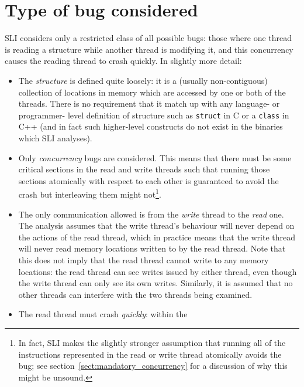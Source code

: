 \section{Type of bug considered}

SLI considers only a restricted class of all possible bugs: those
where one thread is reading a structure while another thread is
modifying it, and this concurrency causes the reading thread to crash
quickly.  In slightly more detail:

\begin{itemize}
\item The \emph{structure} is defined quite loosely: it is a (usually
  non-contiguous) collection of locations in memory which are accessed
  by one or both of the threads.  There is no requirement that it
  match up with any language- or programmer- level definition of
  structure such as \verb|struct| in C or a \verb|class| in C++ (and
  in fact such higher-level constructs do not exist in the binaries
  which SLI analyses).
\item Only \emph{concurrency} bugs are considered.  This means that
  there must be some critical sections in the read and write threads
  such that running those sections atomically with respect to each
  other is guaranteed to avoid the crash but interleaving them might
  not\footnote{In fact, SLI makes the slightly stronger assumption
  that running all of the instructions represented in the read or
  write thread {\StateMachines} atomically avoids the bug; see
  section~\ref{sect:mandatory_concurrency} for a discussion of why
  this might be unsound.}.  
\item The only communication allowed is from the \emph{write} thread
  to the \emph{read} one.  The analysis assumes that the write
  thread's behaviour will never depend on the actions of the read
  thread, which in practice means that the write thread will never
  read memory locations written to by the read thread.  Note that this
  does not imply that the read thread cannot write to any memory
  locations: the read thread can see writes issued by either thread,
  even though the write thread can only see its own writes.
  Similarly, it is assumed that no other threads can interfere with
  the two threads being examined.
\item The read thread must crash \emph{quickly}: within the

\end{itemize}
